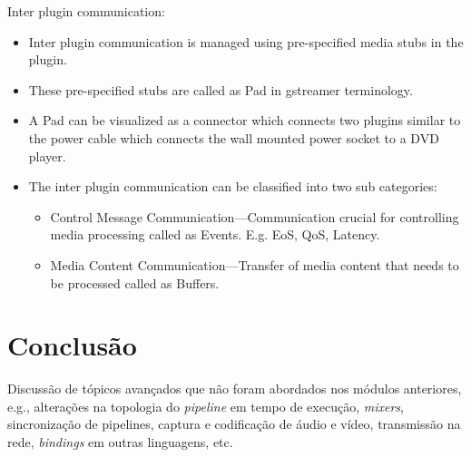 \documentclass{SBCbookchapter}
\begin{document}
Inter plugin communication:

\begin{itemize}
  \item Inter plugin communication is managed using pre-specified media stubs in
        the plugin.
  \item These pre-specified stubs are called as Pad in gstreamer terminology.
  \item A Pad can be visualized as a connector which connects two plugins
        similar to the power cable which connects the wall mounted power socket
        to a DVD player.
  \item The inter plugin communication can be classified into two sub categories:
  \begin{itemize}
    \item Control Message Communication---Communication crucial for controlling
          media processing called as Events. E.g. EoS, QoS, Latency.
    \item Media Content Communication---Transfer of media content that needs to
          be processed called as Buffers.
  \end{itemize}
\end{itemize}


\section{Conclusão}
Discussão de tópicos avançados que não foram abordados nos módulos anteriores,
e.g., alterações na topologia do \emph{pipeline} em tempo de execução,
\emph{mixers}, sincronização de pipelines, captura e codificação de áudio e
vídeo, transmissão na rede, \emph{bindings} em outras linguagens, etc.




\end{document}
